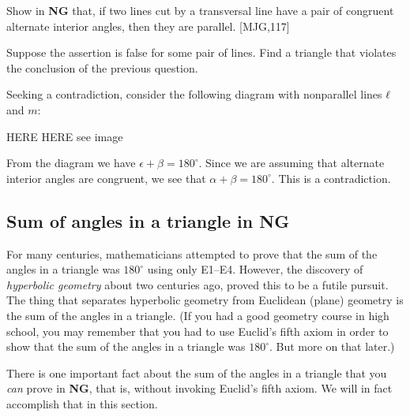 \documentclass{ximera}
\begin{document}
\begin{question}
Show in \textbf{NG} that, if two lines cut by a transversal line have
a pair of congruent alternate interior angles, then they are
parallel. [MJG,117]
\begin{solution}
\begin{hint}
Suppose the assertion is false for some pair of lines. Find a triangle
that violates the conclusion of the previous question.
\end{hint}
Seeking a contradiction, consider the following diagram with
nonparallel lines $\ell$ and $m$:
\begin{image}
\end{image}
HERE HERE see image

From the diagram we have $\epsilon + \beta = 180^\circ$.  Since we are
assuming that alternate interior angles are congruent, we see that
$\alpha+\beta = 180^\circ$. This is a contradiction.
\end{solution}
\end{question}







\subsection*{Sum of angles in a triangle in NG}


For many centuries, mathematicians attempted to prove that the sum of
the angles in a triangle was $180^{\circ}$ using only E1--E4. However,
the discovery of \textit{hyperbolic geometry} about two centuries ago,
proved this to be a futile pursuit. The thing that separates
hyperbolic geometry from Euclidean (plane) geometry is the sum of
the angles in a triangle. (If you had a good geometry course in high
school, you may remember that you had to use Euclid's fifth axiom in
order to show that the sum of the angles in a triangle was
$180^{\circ}.$ But more on that later.)

There is one important fact about the sum of the angles in a triangle that you
\textit{can} prove in \textbf{NG}, that is, without invoking Euclid's fifth
axiom. We will in fact accomplish that in this section.
\end{document}
